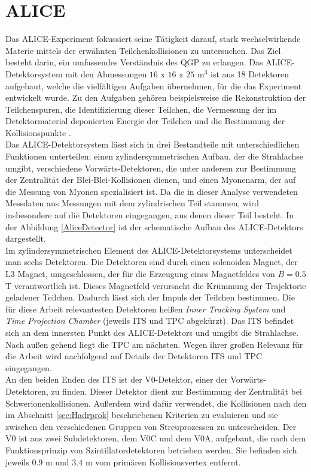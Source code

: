 \documentclass[12pt,a4paper]{report}
\begin{document}
\section{ALICE}
\label{sec:ALICE}
Das ALICE-Experiment fokussiert seine Tätigkeit darauf, stark wechselwirkende Materie mittels der erwähnten Teilchenkollisionen zu untersuchen. Das Ziel besteht darin, ein umfassendes Verständnis des QGP zu erlangen. Das ALICE-Detektorsystem mit den Abmessungen $16$ $\mathrm{x}$ $16$ $\mathrm{x}$ $25$ $\mathrm{m^3}$ ist aus 18 Detektoren aufgebaut, welche die vielfältigen Aufgaben übernehmen, für die das Experiment entwickelt wurde. Zu den Aufgaben gehören beispielsweise die Rekonstruktion der Teilchenspuren, die Identifizierung dieser Teilchen, die Vermessung der im Detektormaterial deponierten Energie der Teilchen und die Bestimmung der Kollisionspunkte \cite{breskin2009cern}.\\
Das ALICE-Detektorsystem lässt sich in drei Bestandteile mit unterschiedlichen Funktionen unterteilen: einen zylindersymmetrischen Aufbau, der die Strahlachse umgibt, verschiedene Vorwärts-Detektoren, die unter anderem zur Bestimmung der Zentralität der Blei-Blei-Kollisionen dienen, und einen Myonenarm, der auf die Messung von Myonen spezialisiert ist. Da die in dieser Analyse verwendeten Messdaten aus Messungen mit dem zylindrischen Teil stammen, wird insbesondere auf die Detektoren eingegangen, aus denen dieser Teil besteht. In der Abbildung \ref{AliceDetector} ist der schematische Aufbau des ALICE-Detektors dargestellt.\\
Im zylindersymmetrischen Element des ALICE-Detektorsystems unterscheidet man sechs Detektoren. Die Detektoren sind durch einen solenoiden Magnet, der L3 Magnet, umgeschlossen, der für die Erzeugung eines Magnetfeldes von $B = 0.5$ T verantwortlich ist. Dieses Magnetfeld verursacht die Krümmung der Trajektorie geladener Teilchen. Dadurch lässt sich der Impuls der Teilchen bestimmen. Die für diese Arbeit relevantesten Detektoren heißen \textit{Inner Tracking System} und \textit{Time Projection Chamber} (jeweils ITS und TPC abgekürzt). Das ITS befindet sich an dem innersten Punkt des ALICE-Detektors und umgibt die Strahlachse. Nach außen gehend liegt die TPC am nächsten. Wegen ihrer großen Relevanz für die Arbeit wird nachfolgend auf Details der Detektoren ITS und TPC eingegangen.\\
An den beiden Enden des ITS ist der V0-Detektor, einer der Vorwärts-Detektoren, zu finden. Dieser Detektor dient zur Bestimmung der Zentralität bei Schwerionenkollisionen. Außerdem wird dafür verwendet, die Kollisionen nach den im Abschnitt \ref{sec:Hadrprok} beschriebenen Kriterien zu evaluieren und sie zwischen den verschiedenen Gruppen von Streuprozessen zu unterscheiden. Der V0 ist aus zwei Subdetektoren, dem V0C und dem V0A, aufgebaut, die nach dem Funktionsprinzip von Szintillatordetektoren betrieben werden. Sie befinden sich jeweils $0.9$ m und $3.4$ m vom primären Kollisionsvertex entfernt. 
\end{document}
